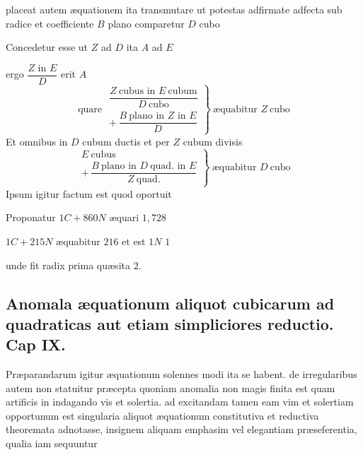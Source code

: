 \documentclass[11pt,a4paper]{article}
\begin{document}

placeat autem æquationem ita transmutare ut potestas adfirmate adfecta sub radice et coefficiente $B$ plano comparetur $D$ cubo

Concedetur esse ut $Z$ ad $D$ ita $A$ ad $E$

ergo $\dfrac{Z \text{ in } E}{D}$ erit $A$
\[ \text{quare } \left.\begin{array}{l} \dfrac{Z\ \text{cubus in } E\ \text{cubum}}{D\ \text{cubo}} \\[2ex] +\,\dfrac{B\ \text{plano in } Z \text{ in } E}{D} \end{array}\right\}\ \text{æquabitur } Z\ \text{cubo} \]
Et omnibus in $D$ cubum ductis et per $Z$ cubum divisis
\[ \left.\begin{array}{l} E\ \text{cubus} \\ +\,\dfrac{B\ \text{plano in } D\ \text{quad. in } E}{Z\ \text{quad.}} \end{array}\right\}\ \text{æquabitur } D\ \text{cubo} \]
Ipsum igitur factum est quod oportuit

Proponatur $1C + 860N$ æquari $1{,}728$

$1C + 215N$ æquabitur $216$ et est $1N$ $1$

unde fit radix prima quæsita $2$.

\subsection*{Anomala æquationum aliquot cubicarum ad quadraticas aut etiam simpliciores reductio. Cap IX.}

Præparandarum igitur æquationum solennes modi ita se habent. de irregularibus autem non statuitur præcepta quoniam anomalia  non magis finita est quam artificis in indagando vis et solertia. ad excitandam tamen eam vim et solertiam opportunum est singularia aliquot æquationum constitutiva et reductiva theoremata adnotasse, insignem aliquam emphasim vel elegantiam præseferentia, qualia iam sequuntur
\end{document}

